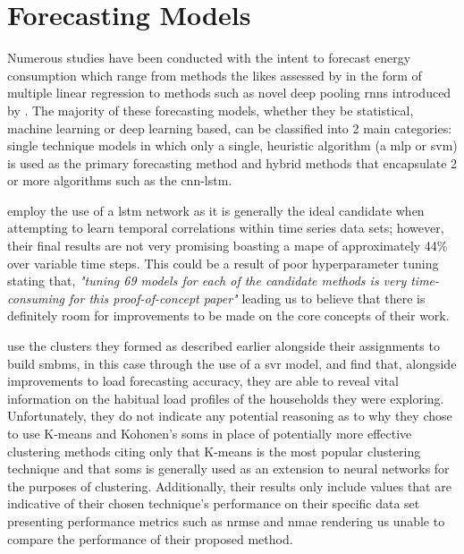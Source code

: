 \section{Forecasting Models}
\label{sec:Related-Work:Forecasting-Models}
Numerous studies have been conducted with the intent to forecast energy consumption which range from methods the likes assessed by \citet{Fumo} in the form of multiple linear regression to methods such as novel deep pooling \glspl{rnn} introduced by \citet{HengShi}. The majority of these forecasting models, whether they be statistical, machine learning or deep learning based, can be classified into 2 main categories: single technique models in which only a single, heuristic algorithm (\eg a \gls{mlp} or \gls{svm}) is used as the primary forecasting method and hybrid methods that encapsulate 2 or more algorithms \cite{Fallah} such as the \gls{cnn-lstm}.

\noindent \newline \citet{Kong}  employ the use of a \gls{lstm} network as it is generally the ideal candidate when attempting to learn temporal correlations within time series data sets; however, their final results are not very promising boasting a \gls{mape} of approximately 44\% over variable time steps. This could be a result of poor hyperparameter tuning stating that, \textit{"tuning 69 models for each of the candidate methods is very time-consuming for this proof-of-concept paper"} leading us to believe that there is definitely room for improvements to be made on the core concepts of their work.

\noindent \newline \citet{Yildiz} use the clusters they formed as described earlier alongside their assignments to build \glspl{smbm}, in this case through the use of a \gls{svr} model, and find that, alongside improvements to load forecasting accuracy, they are able to reveal vital information on the habitual load profiles of the households they were exploring. Unfortunately, they do not indicate any potential reasoning as to why they chose to use K-means and Kohonen's \glspl{som} in place of potentially more effective clustering methods citing only that K-means is the most popular clustering technique \cite{James} and that \glspl{som} is generally used as an extension to neural networks for the purposes of clustering. Additionally, their results only include values that are indicative of their chosen technique's performance on their specific data set presenting performance metrics such as \gls{nrmse} and \gls{nmae} rendering us unable to compare the performance of their proposed method.

